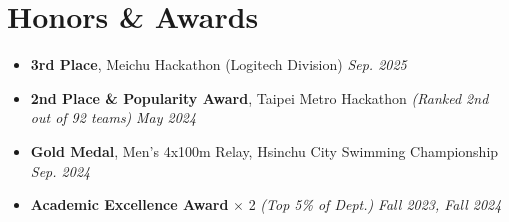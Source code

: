\documentclass[10pt,letterpaper]{article}
\begin{document}
\section*{Honors \& Awards}
\begin{itemize}[leftmargin=1.6em, labelsep=0.4em, topsep=2pt, itemsep=1pt, parsep=0pt]
    \item \textbf{3rd Place}, Meichu Hackathon (Logitech Division) \hfill \textit{Sep. 2025}
    \item \textbf{2nd Place \& Popularity Award}, Taipei Metro Hackathon \textit{(Ranked 2nd out of 92 teams)} \hfill \textit{May 2024}
    \item \textbf{Gold Medal}, Men's 4x100m Relay, Hsinchu City Swimming Championship \hfill \textit{Sep. 2024}
    \item \textbf{Academic Excellence Award} $\times$ 2 \textit{(Top 5\% of Dept.)} \hfill \textit{Fall 2023, Fall 2024}
\end{itemize}
\end{document}
